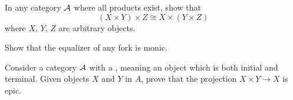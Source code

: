\begin{problem}
	In any category $\AA$ where all products exist,
	show that \[ (X \times Y) \times Z \cong X \times (Y \times Z) \]
	where $X$, $Y$, $Z$ are arbitrary objects.
	\label{prob:associative_product}
\end{problem}

\begin{sproblem}
	Show that the equalizer of any fork is monic.
	\label{prob:equalizer_monic}
\end{sproblem}

\begin{problem}
	\gim
	Consider a category $\AA$ with a ,
	meaning an object which is both initial and terminal. 
	Given objects $X$ and $Y$ in $A$, prove that the projection $X \times Y \to X$ is epic.
\end{problem}

